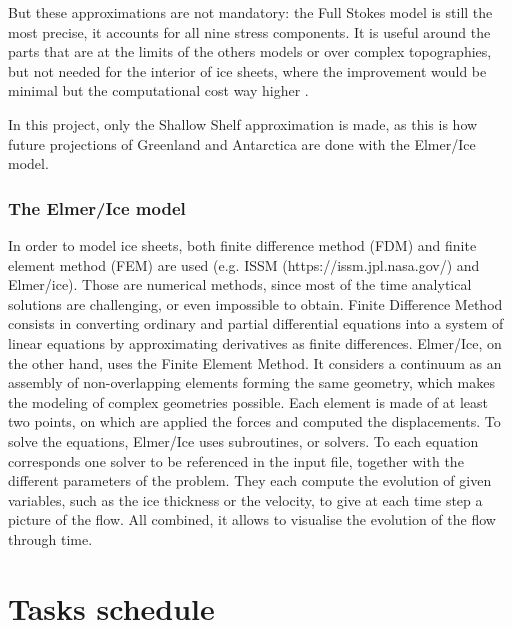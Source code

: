 \documentclass[a4paper,12pt]{article}
\begin{document}
But these approximations are not mandatory: the Full Stokes model is still the most precise, it accounts for all nine stress components. It is useful around the parts that are at the limits of the others models or over complex topographies, but not needed for the interior of ice sheets, where the improvement would be minimal but the computational cost way higher \cite[]{larour2012continental}.

In this project, only the Shallow Shelf approximation is made, as this is how future projections of Greenland and Antarctica are done with the Elmer/Ice model.
\subsubsection{The Elmer/Ice model}
In order to model ice sheets, both finite difference method (FDM) and finite element method (FEM) are used (e.g. ISSM (https://issm.jpl.nasa.gov/) and Elmer/ice). Those are numerical methods, since most of the time analytical solutions are challenging, or even impossible to obtain. Finite Difference Method consists in converting ordinary and partial differential equations into a system of linear equations by approximating derivatives as finite differences. Elmer/Ice, on the other hand, uses the Finite Element Method.
It considers a continuum as an assembly of non-overlapping elements forming the same geometry, which makes the modeling of complex geometries possible. Each element is made of at least two points, on which are applied the forces and computed the displacements. To solve the equations, Elmer/Ice uses subroutines, or solvers. To each equation corresponds one solver to be referenced in the input file, together with the different parameters of the problem. They each compute the evolution of given variables, such as the ice thickness or the velocity, to give at each time step a picture of the flow. All combined, it allows to visualise the evolution of the flow through time.
\section{Tasks schedule}


\end{document}
